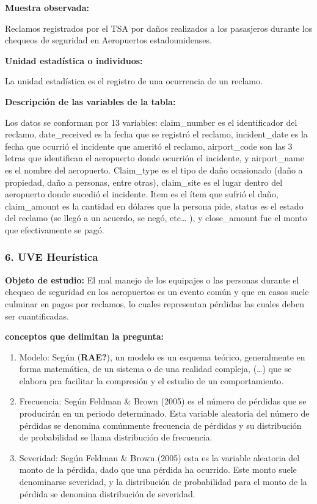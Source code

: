 \documentclass[
  letterpaper,
  onepage,
  openany]{scrreprt}
\begin{document}
\textbf{Muestra observada:}

Reclamos registrados por el TSA por daños realizados a los pasasjeros
durante los chequeos de seguridad en Aeropuertos estadounidenses.

\textbf{Unidad estadística o individuos:}

La unidad estadística es el registro de una ocurrencia de un reclamo.

\textbf{Descripción de las variables de la tabla:}

Los datos se conforman por 13 variables: claim\_number es el
identificador del reclamo, date\_received es la fecha que se registró el
reclamo, incident\_date es la fecha que ocurrió el incidente que ameritó
el reclamo, airport\_code son las 3 letras que identifican el aeropuerto
donde ocurrión el incidente, y airport\_name es el nombre del
aeropuerto. Claim\_type es el tipo de daño ocasionado (daño a propiedad,
daño a personas, entre otras), claim\_site es el lugar dentro del
aeropuerto donde sucedió el incidente. Item es el ítem que sufrió el
daño, claim\_amount es la cantidad en dólares que la persona pide,
status es el estado del reclamo (se llegó a un acuerdo, se negó,
etc\ldots{} ), y close\_amount fue el monto que efectivamente se pagó.

\hypertarget{uve-heuruxedstica}{%
\subsubsection{6. UVE Heurística}\label{uve-heuruxedstica}}

\textbf{Objeto de estudio:} El mal manejo de los equipajes o las
personas durante el chequeo de seguridad en los aeropuertos es un evento
común y que en casos suele culminar en pagos por reclamos, lo cuales
representan pérdidas las cuales deben ser cuantificadas.

\textbf{conceptos que delimitan la pregunta:}

\begin{enumerate}
\def\labelenumi{\arabic{enumi}.}
\item
  Modelo: Según (\textbf{RAE?}), un modelo es un esquema teórico,
  generalmente en forma matemática, de un sistema o de una realidad
  compleja, (\ldots) que se elabora pra facilitar la compresión y el
  estudio de un comportamiento.
\item
  Frecuencia: Según Feldman \& Brown (2005) es el número de pérdidas que
  se producirán en un periodo determinado. Esta variable aleatoria del
  número de pérdidas se denomina comúnmente frecuencia de pérdidas y su
  distribución de probabilidad se llama distribución de frecuencia.
\item
  Severidad: Según Feldman \& Brown (2005) esta es la variable aleatoria
  del monto de la pérdida, dado que una pérdida ha ocurrido. Este monto
  suele denominarse severidad, y la distribución de probabilidad para el
  monto de la pérdida se denomina distribución de severidad.
\end{enumerate}
\end{document}
